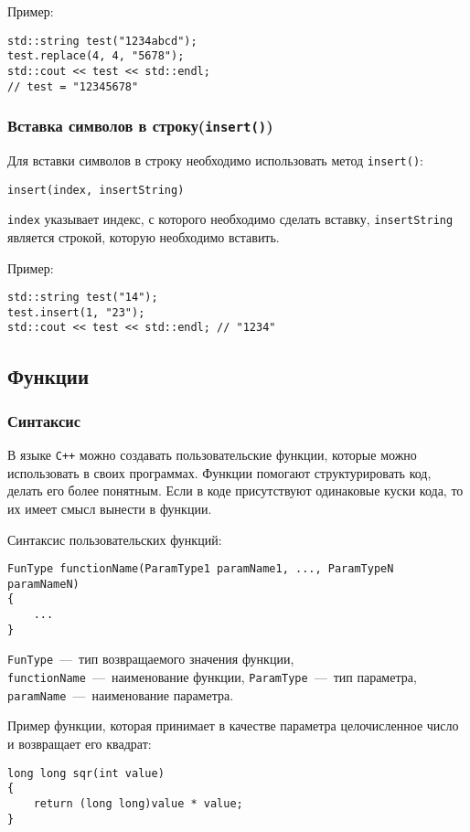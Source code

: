 Пример:
\begin{lstlisting}
std::string test("1234abcd");
test.replace(4, 4, "5678");
std::cout << test << std::endl;
// test = "12345678"
\end{lstlisting}

\subsubsection{Вставка символов в строку(\texttt{insert()})}
Для вставки символов в строку необходимо использовать метод \lstinline|insert()|:

\lstinline|insert(index, insertString)|

\lstinline|index| указывает индекс, с которого необходимо сделать вставку, \lstinline|insertString| является строкой, которую необходимо вставить.

Пример:
\begin{lstlisting}
std::string test("14");
test.insert(1, "23");
std::cout << test << std::endl; // "1234"
\end{lstlisting}

\subsection{Функции}
\subsubsection{Синтаксис}

В языке \texttt{C++} можно создавать пользовательские функции, которые можно использовать в своих программах. Функции помогают структурировать код, делать его более понятным. Если в коде присутствуют одинаковые куски кода, то их имеет смысл вынести в функции.

Синтаксис пользовательских функций:
\begin{lstlisting}
FunType functionName(ParamType1 paramName1, ..., ParamTypeN paramNameN)
{
    ...
}
\end{lstlisting}

\lstinline|FunType|~---~тип возвращаемого значения функции, \lstinline|functionName|~---~наименование функции, \lstinline|ParamType|~---~тип параметра, \lstinline|paramName|~---~наименование параметра.

Пример функции, которая принимает в качестве параметра целочисленное число и возвращает его квадрат:

\begin{lstlisting}
long long sqr(int value)
{
    return (long long)value * value;
}
\end{lstlisting}

